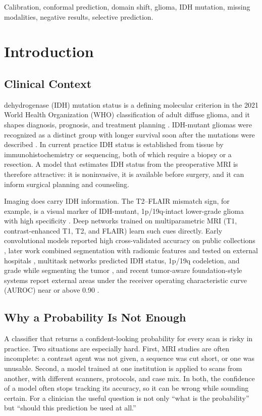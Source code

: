 \documentclass[journal]{IEEEtran}
\begin{document}
\begin{IEEEkeywords}
Calibration, conformal prediction, domain shift, glioma, IDH mutation, missing modalities, negative results, selective prediction.
\end{IEEEkeywords}

\section{Introduction}

\subsection{Clinical Context}
 dehydrogenase (IDH) mutation status is a defining molecular criterion in the 2021 World Health Organization (WHO) classification of adult diffuse glioma, and it shapes diagnosis, prognosis, and treatment planning \cite{louis2021}. IDH-mutant gliomas were recognized as a distinct group with longer survival soon after the mutations were described \cite{yan2009}. In current practice IDH status is established from tissue by immunohistochemistry or sequencing, both of which require a biopsy or a resection. A model that estimates IDH status from the preoperative MRI is therefore attractive: it is noninvasive, it is available before surgery, and it can inform surgical planning and counseling.

Imaging does carry IDH information. The T2--FLAIR mismatch sign, for example, is a visual marker of IDH-mutant, 1p/19q-intact lower-grade glioma with high specificity \cite{patel2017}. Deep networks trained on multiparametric MRI (T1, contrast-enhanced T1, T2, and FLAIR) learn such cues directly. Early convolutional models reported high cross-validated accuracy on public collections \cite{chang2018}, later work combined segmentation with radiomic features and tested on external hospitals \cite{choi2021}, multitask networks predicted IDH status, 1p/19q codeletion, and grade while segmenting the tumor \cite{vandervoort2023}, and recent tumor-aware foundation-style systems report external areas under the receiver operating characteristic curve (AUROC) near or above 0.90 \cite{farahani2025}.

\subsection{Why a Probability Is Not Enough}
A classifier that returns a confident-looking probability for every scan is risky in practice. Two situations are especially hard. First, MRI studies are often incomplete: a contrast agent was not given, a sequence was cut short, or one was unusable. Second, a model trained at one institution is applied to scans from another, with different scanners, protocols, and case mix. In both, the confidence of a model often stops tracking its accuracy, so it can be wrong while sounding certain. For a clinician the useful question is not only ``what is the probability'' but ``should this prediction be used at all.''
\end{document}
